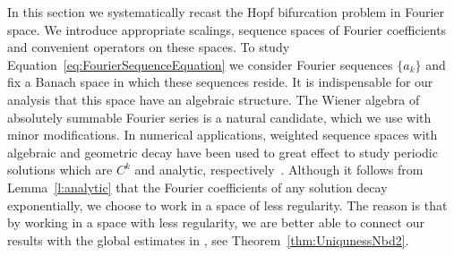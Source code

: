 %

In this section we systematically recast the Hopf bifurcation problem in Fourier space. 
We introduce appropriate scalings, sequence spaces of Fourier coefficients and convenient operators on these spaces. 
To study Equation~\eqref{eq:FourierSequenceEquation} we consider Fourier sequences $ \{a_k\}$ and fix a Banach space in which these sequences reside. It is indispensable for our analysis that this space have an algebraic structure. 
The Wiener algebra of absolutely summable Fourier series is a natural candidate, which we use with minor modifications. 
In numerical applications, weighted sequence spaces with algebraic and geometric decay have been used to great effect to study periodic solutions which are $C^k$ and analytic, respectively~\cite{lessard2010recent,hungria2016rigorous}. 
Although it follows from Lemma~\ref{l:analytic} that the Fourier coefficients of any solution decay exponentially, we choose to work in a space of less regularity. 
The reason is that by working in a space with less regularity, we are better able to connect our results with the global estimates in \cite{neumaier2014global}, see Theorem~\ref{thm:UniqunessNbd2}.


%
%


